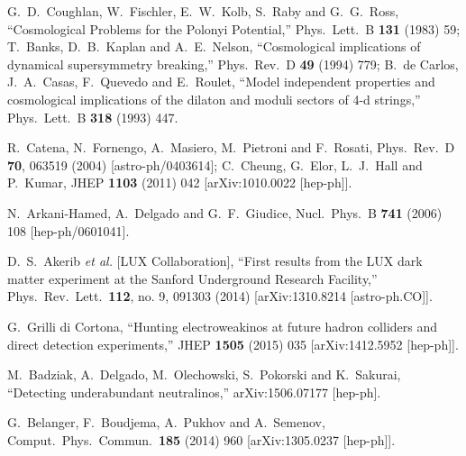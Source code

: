 \documentclass[11pt,a4paper]{article}
\begin{document}
\begin{thebibliography}{9}
  
G.~D.~Coughlan, W.~Fischler, E.~W.~Kolb, S.~Raby and G.~G.~Ross,
  ``Cosmological Problems for the Polonyi Potential,''
  Phys.\ Lett.\ B {\bf 131} (1983) 59;
T.~Banks, D.~B.~Kaplan and A.~E.~Nelson,
  ``Cosmological implications of dynamical supersymmetry breaking,''
  Phys.\ Rev.\ D {\bf 49} (1994) 779;
B.~de Carlos, J.~A.~Casas, F.~Quevedo and E.~Roulet,
  ``Model independent properties and cosmological implications of the dilaton and moduli sectors of 4-d strings,''
  Phys.\ Lett.\ B {\bf 318} (1993) 447.

  
  
  R.~Catena, N.~Fornengo, A.~Masiero, M.~Pietroni and F.~Rosati,
  Phys.\ Rev.\ D {\bf 70}, 063519 (2004)
  [astro-ph/0403614]; 
  C.~Cheung, G.~Elor, L.~J.~Hall and P.~Kumar,
  JHEP {\bf 1103} (2011) 042
  [arXiv:1010.0022 [hep-ph]].
  
 
  
  N.~Arkani-Hamed, A.~Delgado and G.~F.~Giudice,
  Nucl.\ Phys.\ B {\bf 741} (2006) 108
  [hep-ph/0601041].

 

D.~S.~Akerib {\it et al.}  [LUX Collaboration],
  ``First results from the LUX dark matter experiment at the Sanford Underground Research Facility,''
  Phys.\ Rev.\ Lett.\  {\bf 112}, no. 9, 091303 (2014)
  [arXiv:1310.8214 [astro-ph.CO]].
  

  
  G.~Grilli di Cortona,
  ``Hunting electroweakinos at future hadron colliders and direct detection experiments,''
  JHEP {\bf 1505} (2015) 035
  [arXiv:1412.5952 [hep-ph]].
  
  M.~Badziak, A.~Delgado, M.~Olechowski, S.~Pokorski and K.~Sakurai,
  ``Detecting underabundant neutralinos,''
  arXiv:1506.07177 [hep-ph].
  
  G.~Belanger, F.~Boudjema, A.~Pukhov and A.~Semenov,
  Comput.\ Phys.\ Commun.\  {\bf 185} (2014) 960
  [arXiv:1305.0237 [hep-ph]].
  

\end{thebibliography}
\end{document}

